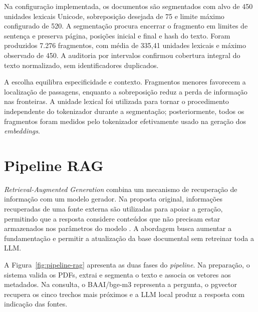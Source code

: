 Na configuração implementada, os documentos são segmentados com alvo de 450 unidades lexicais Unicode, sobreposição desejada de 75 e limite máximo configurado de 520. A segmentação procura encerrar o fragmento em limites de sentença e preserva página, posições inicial e final e hash do texto. Foram produzidos 7.276 fragmentos, com média de 335,41 unidades lexicais e máximo observado de 450. A auditoria por intervalos confirmou cobertura integral do texto normalizado, sem identificadores duplicados.

A escolha equilibra especificidade e contexto. Fragmentos menores favorecem a localização de passagens, enquanto a sobreposição reduz a perda de informação nas fronteiras. A unidade lexical foi utilizada para tornar o procedimento independente do tokenizador durante a segmentação; posteriormente, todos os fragmentos foram medidos pelo tokenizador efetivamente usado na geração dos \textit{embeddings}.

\section{Pipeline RAG}

\textit{Retrieval-Augmented Generation} combina um mecanismo de recuperação de informação com um modelo gerador. Na proposta original, informações recuperadas de uma fonte externa são utilizadas para apoiar a geração, permitindo que a resposta considere conteúdos que não precisam estar armazenados nos parâmetros do modelo \cite{lewis2020rag}. A abordagem busca aumentar a fundamentação e permitir a atualização da base documental sem retreinar toda a LLM.

A Figura~\ref{fig:pipeline-rag} apresenta as duas fases do \textit{pipeline}. Na preparação, o sistema valida os PDFs, extrai e segmenta o texto e associa os vetores aos metadados. Na consulta, o BAAI/bge-m3 representa a pergunta, o pgvector recupera os cinco trechos mais próximos e a LLM local produz a resposta com indicação das fontes.

